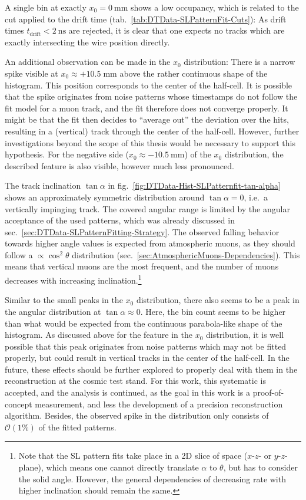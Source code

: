 \par A single bin at exactly $x_0=\SI{0}{\milli\meter}$ shows a low occupancy, which is related to the cut applied to the drift time (tab.\ \ref{tab:DTData-SLPatternFit-Cuts}): As drift times $t_\text{drift}<\SI{2}{\nano\second}$ are rejected, it is clear that one expects no tracks which are exactly intersecting the wire position directly.
\par An additional observation can be made in the $x_0$ distribution: There is a narrow spike visible at $x_0\approx +10.5\;\si{\milli\meter}$ above the rather continuous shape of the histogram. This position corresponds to the center of the half-cell. It is possible that the spike originates from noise patterns whose timestamps do not follow the fit model for a muon track, and the fit therefore does not converge properly. It might be that the fit then decides to \enquote{average out} the deviation over the hits, resulting in a (vertical) track through the center of the half-cell. However, further investigations beyond the scope of this thesis would be necessary to support this hypothesis. For the negative side ($x_0\approx\SI{-10.5}{\milli\meter}$) of the $x_0$ distribution, the described feature is also visible, however much less pronounced.
\par The track inclination $\tan\alpha$ in fig.\ \ref{fig:DTData-Hist-SLPatternfit-tan-alpha} shows an approximately symmetric distribution around $\tan\alpha=0$, i.e.\ a vertically impinging track. The covered angular range is limited by the angular acceptance of the used patterns, which was already discussed in sec.\ \ref{sec:DTData-SLPatternFitting-Strategy}. The observed falling behavior towards higher angle values is expected from atmospheric muons, as they should follow a $\propto \cos^2 \theta$ distribution (sec.\ \ref{sec:AtmosphericMuons-Dependencies}). This means that vertical muons are the most frequent, and the number of muons decreases with increasing inclination.\footnote{Note that the \ac{SL} pattern fits take place in a 2D slice of space ($x$-$z$- or $y$-$z$-plane), which means one cannot directly translate $\alpha$ to $\theta$, but has to consider the solid angle. However, the general dependencies of decreasing rate with higher inclination should remain the same.}
\par Similar to the small peaks in the $x_0$ distribution, there also seems to be a peak in the angular distribution at $\tan\alpha\approx 0$. Here, the bin count seems to be higher than what would be expected from the continuous parabola-like shape of the histogram. As discussed above for the feature in the $x_0$ distribution, it is well possible that this peak originates from noise patterns which may not be fitted properly, but could result in vertical tracks in the center of the half-cell. In the future, these effects should be further explored to properly deal with them in the reconstruction at the cosmic test stand. For this work, this systematic is accepted, and the analysis is continued, as the goal in this work is a proof-of-concept measurement, and less the development of a precision reconstruction algorithm. Besides, the observed spike in the distribution only consists of $\mathcal{O}(1\%)$ of the fitted patterns.
\par 
